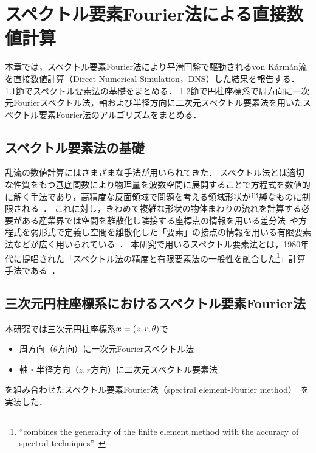\chapter{スペクトル要素Fourier法による直接数値計算}
\label{chap:NumericalCalculation}

本章では，スペクトル要素Fourier法により平滑円盤で駆動されるvon K\'arm\'an流を直接数値計算（Direct Numerical Simulation，DNS）した結果を報告する．
\ref{sec:BasisOfSpectralElementMethod}節でスペクトル要素法の基礎をまとめる．
\ref{sec:SpectralElementFourierMethod}節で円柱座標系で周方向に一次元Fourierスペクトル法，軸および半径方向に二次元スペクトル要素法を用いたスペクトル要素Fourier法のアルゴリズムをまとめる．


\section{スペクトル要素法の基礎}
\label{sec:BasisOfSpectralElementMethod}

乱流の数値計算にはさまざまな手法が用いられてきた．
スペクトル法とは適切な性質をもつ基底関数により物理量を波数空間に展開することで方程式を数値的に解く手法であり，高精度な反面領域で問題を考える領域形状が単純なものに制限される~\cite{Ishioka_spectral}．
これに対し，きわめて複雑な形状の物体まわりの流れを計算する必要がある産業界では空間を離散化し隣接する座標点の情報を用いる差分法~\cite{Kajishima_turbulence_simulation}や方程式を弱形式で定義し空間を離散化した「要素」の接点の情報を用いる有限要素法などが広く用いられている~\cite{1994fem_mathematics}．
本研究で用いるスペクトル要素法とは，1980年代に提唱された「スペクトル法の精度と有限要素法の一般性を融合した\footnote{``combines the generality of the finite element method with the accuracy of spectral techniques''~\cite{Patera1984}}」計算手法である~\cite{karniadakis2005spectral}．


\section{三次元円柱座標系におけるスペクトル要素Fourier法}
\label{sec:SpectralElementFourierMethod}

本研究では三次元円柱座標系\(\vb*{x} = (z,r,\theta)\)で
\begin{itemize}
  \item 周方向（\(\theta\)方向）に一次元Fourierスペクトル法
  \item 軸・半径方向（\(z,r\)方向）に二次元スペクトル要素法
\end{itemize}
を組み合わせたスペクトル要素Fourier法（spectral element-Fourier method）~\cite{Karniadakis1991,Blackburn2004}を実装した．

